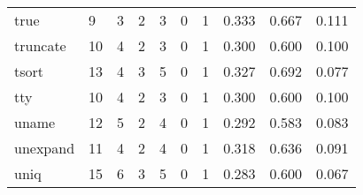 \begin{longtable}{lp{1.3cm}p{1.3cm}p{1.3cm}p{1.3cm}p{1.3cm}p{1.3cm}p{1.3cm}p{1.3cm}p{1.3cm}}
true      &                      9 &                                             3 &                                            2 &                                           3 &                                            0 &                                          1 &                                0.333 &                                  0.667 &                                0.111 \\
truncate  &                     10 &                                             4 &                                            2 &                                           3 &                                            0 &                                          1 &                                0.300 &                                  0.600 &                                0.100 \\
tsort     &                     13 &                                             4 &                                            3 &                                           5 &                                            0 &                                          1 &                                0.327 &                                  0.692 &                                0.077 \\
tty       &                     10 &                                             4 &                                            2 &                                           3 &                                            0 &                                          1 &                                0.300 &                                  0.600 &                                0.100 \\
uname     &                     12 &                                             5 &                                            2 &                                           4 &                                            0 &                                          1 &                                0.292 &                                  0.583 &                                0.083 \\
unexpand  &                     11 &                                             4 &                                            2 &                                           4 &                                            0 &                                          1 &                                0.318 &                                  0.636 &                                0.091 \\
uniq      &                     15 &                                             6 &                                            3 &                                           5 &                                            0 &                                          1 &                                0.283 &                                  0.600 &                                0.067 \\

\end{longtable}
